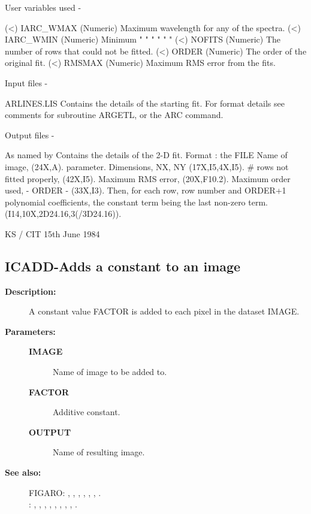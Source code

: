 \begin{description}
\begin{description}
\begin{terminalv}
 User variables used -

 (<) IARC_WMAX   (Numeric) Maximum wavelength for any of the spectra.
 (<) IARC_WMIN   (Numeric) Minimum     "       "   "  "   "    "
 (<) NOFITS      (Numeric) The number of rows that could not be fitted.
 (<) ORDER       (Numeric) The order of the original fit.
 (<) RMSMAX      (Numeric) Maximum RMS error from the fits.

 Input files -

 ARLINES.LIS   Contains the details of the starting fit.  For format
               details see comments for subroutine ARGETL, or the
               ARC command.

 Output files -

 As named by   Contains the details of the 2-D fit.  Format :
 the FILE      Name of image, (24X,A).
 parameter.    Dimensions, NX, NY (17X,I5,4X,I5).
               # rows not fitted properly, (42X,I5).
               Maximum RMS error, (20X,F10.2).
               Maximum order used, - ORDER - (33X,I3).
               Then, for each row, row number and ORDER+1 polynomial
               coefficients, the constant term being the last
               non-zero term.  (I14,10X,2D24.16,3(/3D24.16)).

                                KS / CIT  15th June 1984
\end{terminalv}
\end{description}
\subsection{ICADD-\label{ICADD}Adds a constant to an image}
\begin{description}

\item [\textbf{Description:}]
 A constant value FACTOR is added to each pixel in the dataset
 IMAGE.

\item [\textbf{Parameters:}]
\begin{description}
\item [\textbf{IMAGE}]
 Name of image to be added to.
\item [\textbf{FACTOR}]
 Additive constant.
\item [\textbf{OUTPUT}]
 Name of resulting image.
\end{description}

\item [\textbf{See also:}]
FIGARO: , , , , , , .\\
: , , , , , , , , .\\


\end{description}
\end{description}
